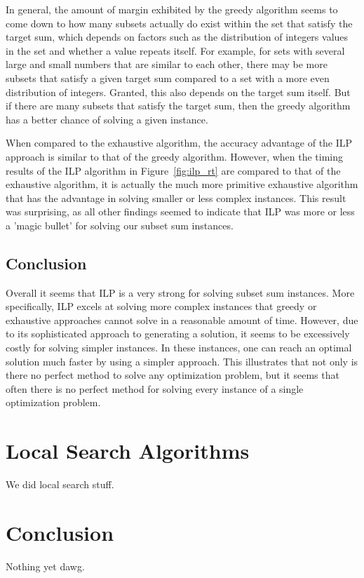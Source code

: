 \documentclass{report}
\begin{document}
In general, the amount of margin exhibited by the greedy algorithm seems to come down to how many
subsets actually do exist within the set that satisfy the target sum, which depends on factors such 
as the distribution of integers values in the set and whether a value repeats itself.
For example, for sets with several large and small numbers that are similar to each other, there may
be more subsets that satisfy a given target sum compared to a set with a more even distribution of integers.
Granted, this also depends on the target sum itself. But if there are many subsets that satisfy the
target sum, then the greedy algorithm has a better chance of solving a given instance. 

When compared to the exhaustive algorithm, the accuracy advantage of the ILP approach is similar to
that of the greedy algorithm. However, when the timing results of the ILP algorithm in Figure~\ref{fig:ilp_rt}
are compared to that of the exhaustive algorithm, it is actually the much more primitive exhaustive
algorithm that has the advantage in solving smaller or less complex instances. This result was surprising,
as all other findings seemed to indicate that ILP was more or less a 'magic bullet' for solving our
subset sum instances.

\section{Conclusion}

Overall it seems that ILP is a very strong for solving subset sum instances.
More specifically, ILP excels at solving more complex instances that greedy or exhaustive
approaches cannot solve in a reasonable amount of time. However, due to its sophisticated approach to generating
a solution, it seems to be excessively costly for solving simpler instances. In these instances, one can reach
an optimal solution much faster by using a simpler approach. This illustrates that not only is there no perfect 
method to solve any optimization problem, but it seems that often there is no perfect method for solving every
instance of a single optimization problem.


\chapter{Local Search Algorithms}
We did local search stuff.

\chapter{Conclusion}
Nothing yet dawg.



\end{document}
